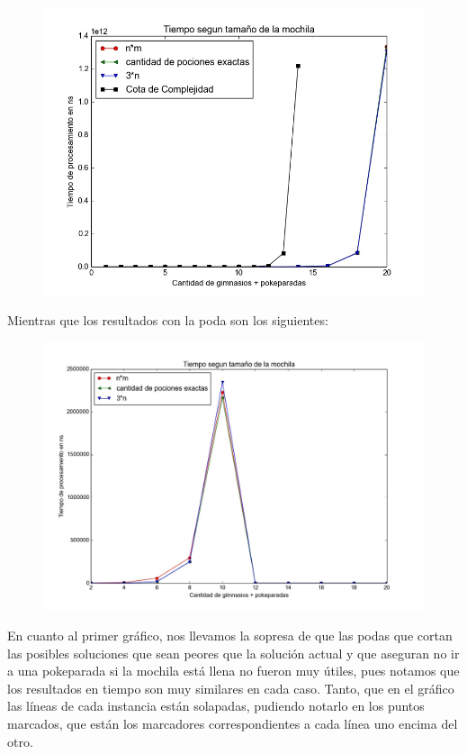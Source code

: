   \begin{figure}[H]
      \begin{center}
        \includegraphics[width=0.7\columnwidth]{imagenes/exp1_ej1.jpeg}
        \caption{}
      \end{center}
  \end{figure}

      Mientras que los resultados con la poda son los siguientes:

  \begin{figure}[H]
      \begin{center}
        \includegraphics[width=0.7\columnwidth]{imagenes/exp1_2_ej1.jpeg}
        \caption{}
      \end{center}
  \end{figure}

      En cuanto al primer gráfico, nos llevamos la sopresa de que las podas que cortan las posibles soluciones que sean peores que la solución actual y que aseguran no ir a una pokeparada si la mochila está llena no fueron muy útiles, pues notamos que los resultados en tiempo son muy similares en cada caso. Tanto, que en el gráfico las líneas de cada instancia están solapadas, pudiendo notarlo en los puntos marcados, que están los marcadores correspondientes a cada línea uno encima del otro.

